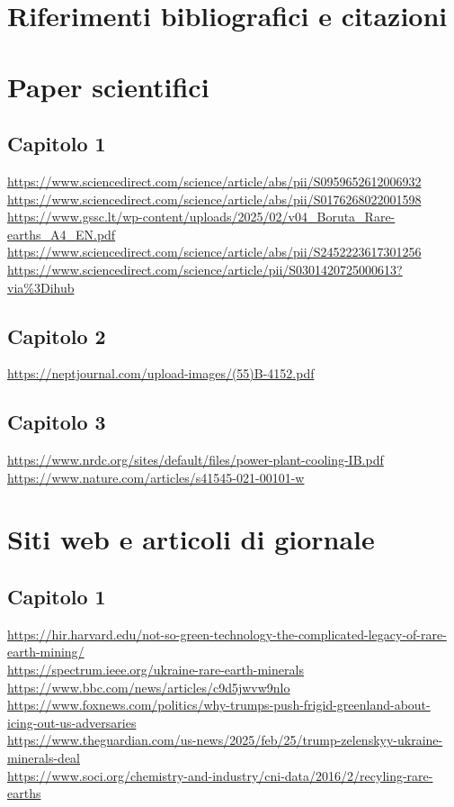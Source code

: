 \documentclass[12pt,a4paper,oneside]{book}
\begin{document}
\section*{Riferimenti bibliografici e citazioni}
\nocite{*}


\section*{Paper scientifici}
\subsection*{Capitolo 1}
\sloppy

\url{https://www.sciencedirect.com/science/article/abs/pii/S0959652612006932} \\
\url{https://www.sciencedirect.com/science/article/abs/pii/S0176268022001598} \\
\url{https://www.gssc.lt/wp-content/uploads/2025/02/v04_Boruta_Rare-earths_A4_EN.pdf} \\
\url{https://www.sciencedirect.com/science/article/abs/pii/S2452223617301256} \\
\url{https://www.sciencedirect.com/science/article/pii/S0301420725000613?via%3Dihub}

\subsection*{Capitolo 2}
\url{https://neptjournal.com/upload-images/(55)B-4152.pdf}

\subsection*{Capitolo 3}
\url{https://www.nrdc.org/sites/default/files/power-plant-cooling-IB.pdf}\\
\url{https://www.nature.com/articles/s41545-021-00101-w}

\section*{Siti web e articoli di giornale}
\subsection*{Capitolo 1}
\url{https://hir.harvard.edu/not-so-green-technology-the-complicated-legacy-of-rare-earth-mining/} \\
\url{https://spectrum.ieee.org/ukraine-rare-earth-minerals} \\
\url{https://www.bbc.com/news/articles/c9d5jwvw9nlo} \\
\url{https://www.foxnews.com/politics/why-trumps-push-frigid-greenland-about-icing-out-us-adversaries} \\
\url{https://www.theguardian.com/us-news/2025/feb/25/trump-zelenskyy-ukraine-minerals-deal} \\
\url{https://www.soci.org/chemistry-and-industry/cni-data/2016/2/recyling-rare-earths}
\end{document}
